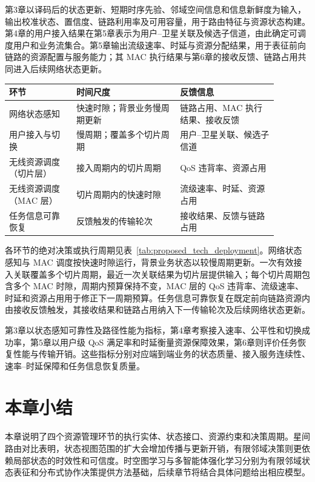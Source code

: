 第3章以译码后的状态更新、短期时序先验、邻域空间信息和信息新鲜度为输入，输出校准状态、置信度、链路利用率及可用容量，用于路由特征与资源状态构建。第4章的用户接入结果在第5章表示为用户--卫星关联及候选子信道，由此确定可调度用户和业务流集合。第5章输出流级速率、时延与资源分配结果，用于表征前向链路的资源配置与服务能力；其 MAC 执行结果与第6章的接收反馈、链路占用共同进入后续网络状态更新。

\begin{table}[!htp]
\centering
{}
\label{tab:ch2_e2e_timescales}
\footnotesize
\setlength{\tabcolsep}{4pt}
\renewcommand{\arraystretch}{1.18}
\begin{tabular}{p{0.22\linewidth} p{0.34\linewidth} p{0.32\linewidth}}
\toprule
环节 & 时间尺度 & 反馈信息 \\
\midrule
网络状态感知
& 快速时隙；背景业务慢周期更新
& 链路占用、MAC 执行结果、接收反馈 \\
用户接入与切换
& 慢周期；覆盖多个切片周期
& 用户--卫星关联、候选子信道 \\
无线资源调度（切片层）
& 接入周期内的切片周期
& QoS 违背率、资源占用 \\
无线资源调度（MAC 层）
& 切片周期内的快速时隙
& 流级速率、时延、资源占用 \\
任务信息可靠恢复
& 反馈触发的传输轮次
& 接收结果、反馈与链路占用 \\
\bottomrule
\end{tabular}
\end{table}

各环节的绝对决策或执行周期见表~\ref{tab:proposed_tech_deployment}。网络状态感知与 MAC 调度按快速时隙运行，背景业务状态以较慢周期更新。一次有效接入关联覆盖多个切片周期，最近一次关联结果为切片层提供输入；每个切片周期包含多个 MAC 时隙，周期内预算保持不变，MAC 层的 QoS 违背率、流级速率、时延和资源占用用于修正下一周期预算。任务信息可靠恢复在既定前向链路资源内由接收反馈触发，其接收结果和链路占用纳入下一传输轮次及后续网络状态更新。

第3章以状态感知可靠性及路径性能为指标，第4章考察接入速率、公平性和切换成功率，第5章以用户级 QoS 满足率和时延衡量资源保障效果，第6章则评价任务恢复性能与传输开销。这些指标分别对应端到端业务的状态质量、接入服务连续性、速率--时延保障和任务信息恢复质量。

\section{本章小结} 
本章说明了四个资源管理环节的执行实体、状态接口、资源约束和决策周期。星间路由对比表明，状态视图范围的扩大会增加传播与更新开销，有限邻域决策则更依赖局部状态的时效性和可信度。时空图学习与多智能体强化学习分别为有限邻域状态表征和分布式协作决策提供方法基础，后续章节将结合具体问题给出相应模型。
